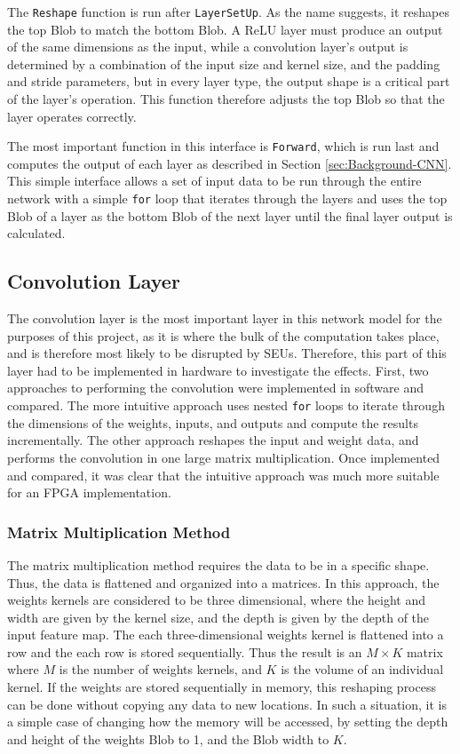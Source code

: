 \documentclass[12pt]{article}
\begin{document}
The \lstinline|Reshape| function is run after \lstinline|LayerSetUp|. As the name suggests, it reshapes the top Blob to match the bottom Blob. A ReLU layer must produce an output of the same dimensions as the input, while a convolution layer's output is determined by a combination of the input size and kernel size, and the padding and stride parameters, but in every layer type, the output shape is a critical part of the layer's operation. This function therefore adjusts the top Blob so that the layer operates correctly.

The most important function in this interface is \lstinline|Forward|, which is run last and computes the output of each layer as described in Section \ref{sec:Background-CNN}. This simple interface allows a set of input data to be run through the entire network with a simple \lstinline|for| loop that iterates through the layers and uses the top Blob of a layer as the bottom Blob of the next layer until the final layer output is calculated.

\subsection{Convolution Layer}
\label{sec:Design-Conv}

The convolution layer is the most important layer in this network model for the purposes of this project, as it is where the bulk of the computation takes place, and is therefore most likely to be disrupted by SEUs. Therefore, this part of this layer had to be implemented in hardware to investigate the effects. First, two approaches to performing the convolution were implemented in software and compared. The more intuitive approach uses nested \lstinline|for| loops to iterate through the dimensions of the weights, inputs, and outputs and compute the results incrementally. The other approach reshapes the input and weight data, and performs the convolution in one large matrix multiplication. Once implemented and compared, it was clear that the intuitive approach was much more suitable for an FPGA implementation.

\subsubsection{Matrix Multiplication Method}
\label{sec:Design-Conv-MM}

The matrix multiplication method requires the data to be in a specific shape. Thus, the data is flattened and organized into a matrices. In this approach, the weights kernels are considered to be three dimensional, where the height and width are given by the kernel size, and the depth is given by the depth of the input feature map. The each three-dimensional weights kernel is flattened into a row and the each row is stored sequentially. Thus the result is an $M \times K$ matrix where $M$ is the number of weights kernels, and $K$ is the volume of an individual kernel. If the weights are stored sequentially in memory, this reshaping process can be done without copying any data to new locations. In such a situation, it is a simple case of changing how the memory will be accessed, by setting the depth and height of the weights Blob to 1, and the Blob width to $K$.
\end{document}
